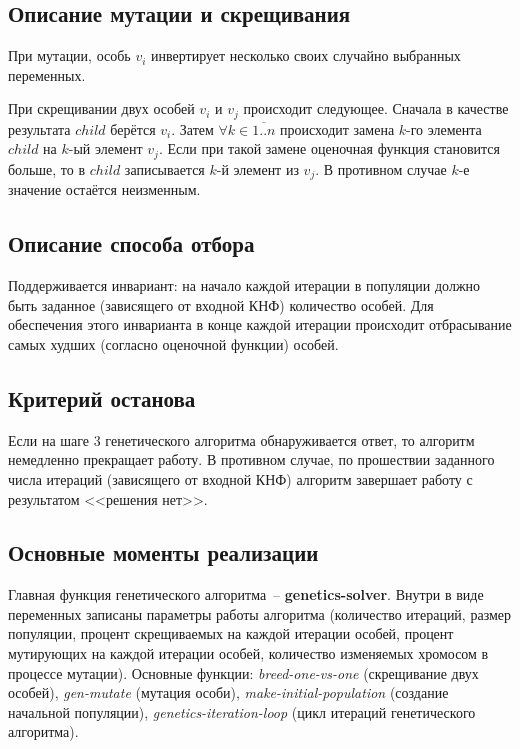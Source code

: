\documentclass[12pt]{article}
\begin{document}
        \subsection{Описание мутации и скрещивания}
        При мутации, особь $v_i$ инвертирует несколько своих случайно выбранных переменных.

        При скрещивании двух особей $v_i$ и $v_j$ происходит следующее. Сначала в качестве результата $child$ берётся $v_i$. Затем $\forall k \in \overline{1..n}$ 
        происходит замена $k$-го 
        элемента $child$ на $k$-ый элемент $v_j$. Если при такой замене оценочная функция становится больше, то в $child$ записывается $k$-й элемент из $v_j$. В противном
        случае $k$-е значение остаётся неизменным.

        \subsection{Описание способа отбора}
        Поддерживается инвариант: на начало каждой итерации в популяции должно быть заданное (зависящего от входной КНФ)
        количество особей. Для обеспечения этого инварианта в конце каждой итерации
        происходит отбрасывание самых худших (согласно оценочной функции) особей.

        \subsection{Критерий останова}
        Если на шаге 3 генетического алгоритма обнаруживается ответ, то алгоритм немедленно прекращает работу. В противном случае, по прошествии заданного числа итераций (зависящего
        от входной КНФ) алгоритм завершает работу с результатом <<решения нет>>.

        \subsection{Основные моменты реализации}
        Главная функция генетического алгоритма~-- \textbf{genetics-solver}. Внутри в виде переменных записаны параметры работы алгоритма (количество итераций, размер популяции,
        процент скрещиваемых на каждой итерации особей, процент мутирующих на каждой итерации особей, количество изменяемых хромосом в процессе мутации).
        Основные функции: \textit{breed-one-vs-one} (скрещивание двух особей), \textit{gen-mutate} (мутация особи),
        \textit{make-initial-population} (создание начальной популяции), \textit{genetics-iteration-loop}
        (цикл итераций генетического алгоритма).
\end{document}
